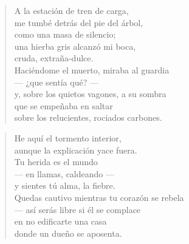 \newpage

\vspace*{-15mm}
\centeredornament




\begin{verse}
  A la estación de tren de carga, \\
  me tumbé detrás del pie del árbol, \\
  como una masa de silencio; \\
  una hierba gris alcanzó mi boca, \\
  cruda, extraña-dulce. \\
  Haciéndome el muerto, miraba al guardia \\
  --- ¿que sentía qué? --- \\
  y, sobre los quietos vagones, a su sombra \\
  que se empeñaba en saltar \\
  sobre los relucientes, rociados carbones. \\
\end{verse}

\bigskip



\begin{verse}
  He aquí el tormento interior, \\
  aunque la explicación yace fuera. \\
  Tu herida es el mundo \\
  --- en llamas, caldeando --- \\
  y sientes tú alma, la fiebre. \\
  Quedas cautivo mientras tu corazón se rebela \\
  --- así serás libre si él se complace \\
  en no edificarte una casa \\
  donde un dueño se aposenta. \\
\end{verse}

